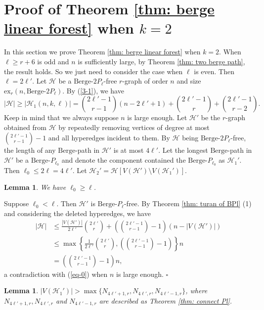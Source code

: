 \documentclass[12pt]{article}%
\newtheorem{lemma}[theorem]{Lemma}
\newenvironment{proof}{{\noindent\it Proof.}}{\hfill $\square$\par}
\newcommand{\ber}{\text{Berge-}}
\newcommand{\mh}{\mathcal{H}}
\begin{document}
\section{Proof of Theorem \ref{thm: berge linear forest} when $k=2$}

In this section we prove  Theorem \ref{thm: berge linear forest} when $k=2$. When $\ell\geq r+6$ is odd and $n$ is sufficiently large, by Theorem \ref{thm: two berge path}, the result holds. %
 So we just need to consider the case when $\ell$ is even. Then $\ell=2\ell'$. Let $\mathcal{H}$ be a $\ber 2P_\ell$-free $r$-graph of order $n$  and size $\mathrm{ex}_{r}(n,\ber 2P_{\ell})$. By (\ref{3-1}), we have
  \begin{equation}\label{eq-0}
 |\mathcal{H}|\ge |\mathcal{H}_1(n,k,\ell)|=\binom{2\ell'-1}{r-1}(n-2\ell'+1)+\binom{2\ell'-1}{r}+\binom{2\ell'-1}{r-2}.\end{equation} Keep in mind that we always suppose $n$ is large enough. Let $\mathcal{H}'$ be the $r$-graph  obtained from $\mathcal{H}$ by repeatedly removing vertices of degree at most $\binom{2\ell'-1}{r-1}-1$ and all hyperedges incident to them. By $\mathcal{H}$ being  $\ber 2P_\ell$-free, the length of any $\ber$path in $\mh'$ is at most $4\ell'$. Let  the longest $\ber$path in $\mh'$ be a $\ber P_{\ell_0}$ and  denote the  component contained the $\ber P_{\ell_0}$ as $\mh_{1}'$. Then $\ell_{0}\leq 2\ell=4\ell'$. Let   $\mh_{2}'=\mh[V(\mh')\setminus V(\mh_{1}')]$.
 \begin{lemma}\label{2-01} We have $\ell_{0}\ge \ell$.
 \end{lemma}
 \begin{proof} Suppose $\ell_0<\ell$. Then $\mh'$ is $\ber P_{\ell}$-free. By Theorem \ref{thm: turan of BPl} (1) and considering the deleted hyperedges, we have
    \begin{align*}
    |\mathcal{H}|&\le \frac{|V(\mh')|}{2\ell'}{2\ell'\choose r}+\left(\binom{2\ell'-1}{r-1}-1\right)(n-|V(\mh')|)\\
    &\leq \max\left\{\frac{1}{2\ell'}{2\ell'\choose r},\left(\binom{2\ell'-1}{r-1}-1\right)\right\}n\\
    &=\left(\binom{2\ell'-1}{r-1}-1\right)n,
    \end{align*}a contradiction with (\ref{eq-0}) when $n$ is large enough.
 \end{proof}
\begin{lemma}\label{2-11} $|V(\mh_{1}')|> \max\{N_{4\ell'+1,r},N_{4\ell',r},N_{4\ell'-1,r}\}$, where $N_{4\ell'+1,r},N_{4\ell',r}$ and $N_{4\ell'-1,r}$ are described as Theorem \ref{thm: connect Pl}.
 \end{lemma}
\end{document}
